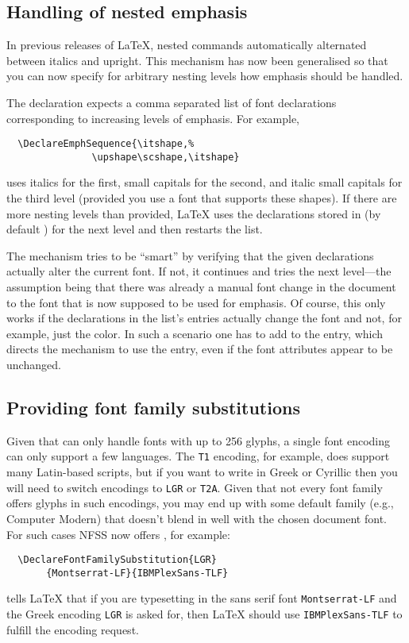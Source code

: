 \documentclass{ltnews}
\providecommand\pdfTeX{\hologo{pdfTeX}}
\begin{document}
\subsection{Handling of nested emphasis}

In previous releases of \LaTeX{}, nested  commands
automatically alternated between italics and upright.  This mechanism
has now been generalised so that you can now specify for arbitrary nesting
levels how emphasis should be handled.

The declaration  expects a comma separated
list of font declarations corresponding to increasing levels of
emphasis. For example,
\begin{verbatim}
  \DeclareEmphSequence{\itshape,%
               \upshape\scshape,\itshape}
\end{verbatim}
uses italics for the first, small capitals for the second, and italic
small capitals for the third level (provided you use a font that
supports these shapes).  If there are more nesting levels than
provided, \LaTeX{} uses the declarations stored in  (by
default ) for the next level and then
restarts the list.

The mechanism tries to be \enquote{smart} by verifying that the given
declarations actually alter the current font. If not, it continues and
tries the next level---the assumption being that there was already a
manual font change in the document to the font that is now supposed to
be used for emphasis.
%
Of course, this only works if the declarations in the list's entries
actually change the font and not, for example, just the color. In such
a scenario one has to add  to the entry, which directs the
mechanism to use the entry, even if the font attributes appear to be
unchanged.


\subsection{Providing font family substitutions}

Given that \pdfTeX{} can only handle fonts with up to 256 glyphs, a
single font encoding can only support a few languages. The \texttt{T1}
encoding, for example, does support many Latin-based scripts,
but if you want to write in Greek or Cyrillic then you will need to switch
encodings to \texttt{LGR} or \texttt{T2A}. Given that not every font
family offers glyphs in such encodings, you may end up with some
default family (e.g., Computer Modern) that doesn’t blend in well
with the chosen document font.  For such cases NFSS now offers
, for example:
\begin{verbatim}
  \DeclareFontFamilySubstitution{LGR}
       {Montserrat-LF}{IBMPlexSans-TLF}
\end{verbatim}
tells \LaTeX{} that if you are typesetting in the sans serif font
\texttt{Montserrat-LF} and the Greek encoding \texttt{LGR} is asked
for, then \LaTeX{} should use \texttt{IBMPlexSans-TLF} to fulfill
the encoding request.
\end{document}
